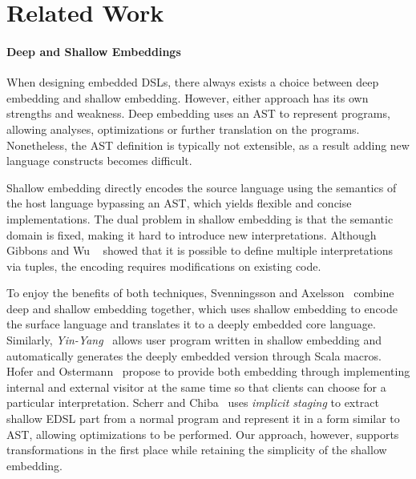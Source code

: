 \section{Related Work}

\paragraph{Deep and Shallow Embeddings}
When designing embedded DSLs, there always exists a choice between deep
embedding and shallow embedding.
However, either approach has its own strengths and weakness.
Deep embedding uses an AST to represent programs, allowing
analyses, optimizations or further translation on the programs.
Nonetheless, the AST definition is typically not extensible, as a result
adding new language constructs becomes difficult.

Shallow embedding directly encodes the source language using the semantics of
the host language bypassing an AST, which yields flexible and concise implementations.
The dual problem in shallow embedding is that the semantic domain is fixed,
making it hard to introduce new interpretations.
Although Gibbons and Wu ~\cite{gibbons} showed that it is possible to define multiple
interpretations via tuples, the encoding requires modifications on existing code.

To enjoy the benefits of both techniques, Svenningsson and Axelsson~\cite{svenningsson2012combining}
combine deep and shallow embedding together, which uses shallow embedding to
encode the surface language and translates it to a deeply embedded core language.
Similarly, \emph{Yin-Yang}~\cite{Jovanovic:2014:YCD:2658761.2658771} allows user
program written in shallow embedding and automatically generates the deeply
embedded version through Scala macros. Hofer and Ostermann~\cite{hofer2010modular} propose to provide both embedding through implementing internal and external visitor at
the same time so that clients can choose for a particular interpretation.
Scherr and Chiba~\cite{scherr2014implicit} uses \emph{implicit staging} to
extract shallow EDSL part from a normal program and represent it in a form
similar to AST, allowing optimizations to be performed.
Our approach, however, supports transformations in the first place while retaining the
simplicity of the shallow embedding.



